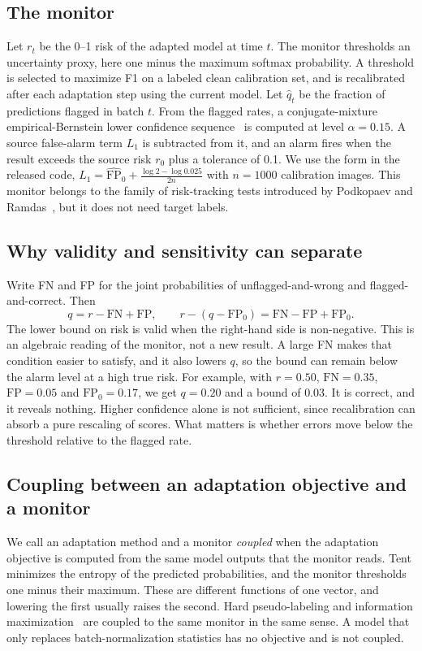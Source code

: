 \documentclass[runningheads]{llncs}
\begin{document}
\subsection{The monitor}
Let $r_t$ be the 0--1 risk of the adapted model at time $t$. The monitor thresholds an uncertainty proxy, here one minus the maximum softmax probability. A threshold is selected to maximize F1 on a labeled clean calibration set, and is recalibrated after each adaptation step using the current model. Let $\hat q_t$ be the fraction of predictions flagged in batch $t$. From the flagged rates, a conjugate-mixture empirical-Bernstein lower confidence sequence~\cite{Howard2021ConfidenceSequences} is computed at level $\alpha=0.15$. A source false-alarm term $L_1$ is subtracted from it, and an alarm fires when the result exceeds the source risk $r_0$ plus a tolerance of 0.1. We use the form in the released code, $L_1=\widehat{\mathrm{FP}}_0+\frac{\log 2-\log 0.025}{2n}$ with $n=1000$ calibration images. This monitor belongs to the family of risk-tracking tests introduced by Podkopaev and Ramdas~\cite{Podkopaev2022RiskMonitoring}, but it does not need target labels.

\subsection{Why validity and sensitivity can separate}
Write FN and FP for the joint probabilities of unflagged-and-wrong and flagged-and-correct. Then
\begin{equation}
q = r - \mathrm{FN} + \mathrm{FP}, \qquad r-(q-\mathrm{FP}_0)=\mathrm{FN}-\mathrm{FP}+\mathrm{FP}_0 .
\end{equation}
The lower bound on risk is valid when the right-hand side is non-negative. This is an algebraic reading of the monitor, not a new result. A large FN makes that condition easier to satisfy, and it also lowers $q$, so the bound can remain below the alarm level at a high true risk. For example, with $r=0.50$, $\mathrm{FN}=0.35$, $\mathrm{FP}=0.05$ and $\mathrm{FP}_0=0.17$, we get $q=0.20$ and a bound of $0.03$. It is correct, and it reveals nothing. Higher confidence alone is not sufficient, since recalibration can absorb a pure rescaling of scores. What matters is whether errors move below the threshold relative to the flagged rate.

\subsection{Coupling between an adaptation objective and a monitor}
\label{sec:coupling}
We call an adaptation method and a monitor \emph{coupled} when the adaptation objective is computed from the same model outputs that the monitor reads. Tent minimizes the entropy of the predicted probabilities, and the monitor thresholds one minus their maximum. These are different functions of one vector, and lowering the first usually raises the second. Hard pseudo-labeling and information maximization~\cite{Liang2020SHOT} are coupled to the same monitor in the same sense. A model that only replaces batch-normalization statistics has no objective and is not coupled.
\end{document}
